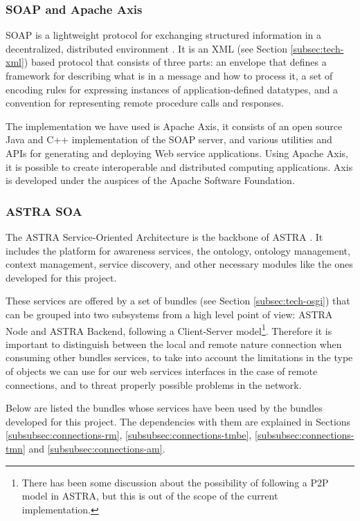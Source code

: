 \subsubsection{SOAP and Apache Axis}
\label{subsubsec:tech-soap-axis}
SOAP is a lightweight protocol for exchanging structured information in a 
decentralized, distributed environment \cite{w3c-soap-spec}. It is an XML (see
Section \ref{subsec:tech-xml}) based protocol that consists of three parts: an 
envelope that defines a framework for describing what is in a message and how 
to process it, a set of encoding rules for expressing instances of 
application-defined datatypes, and a convention for representing remote 
procedure calls and responses.

The implementation we have used is Apache Axis, it consists of an open source 
Java and C++ implementation of the SOAP server, and various utilities and APIs
for generating and deploying Web service applications. Using Apache Axis, 
it is possible to create interoperable and distributed computing applications.
Axis is developed under the auspices of the Apache Software Foundation.


\subsubsection{ASTRA SOA}
\label{subsubsec:tech-astra-soa}
The ASTRA Service-Oriented Architecture is the backbone of ASTRA 
\cite{astra-soa-white-paper}. It includes the platform for awareness services, 
the ontology, ontology management, context management, service discovery, and 
other necessary modules like the ones developed for this project.

These services are offered by a set of bundles (see Section \ref{subsec:tech-osgi})
that can be grouped into two subsystems from a high level point of view: ASTRA
Node and ASTRA Backend, following a Client-Server model\footnote{There has
been some discussion about the possibility of following a P2P model in ASTRA,
but this is out of the scope of the current implementation.}. Therefore it is
important to distinguish between the local and remote nature connection when 
consuming other bundles services, to take into account the limitations in the
type of objects we can use for our web services interfaces in the case of remote
connections, and to threat properly possible problems in the network.

Below are listed the bundles whose services have been used by the bundles
developed for this project. The dependencies with them are explained in Sections
\ref{subsubsec:connections-rm}, \ref{subsubsec:connections-tmbe},
\ref{subsubsec:connections-tmn} and \ref{subsubsec:connections-am}.

